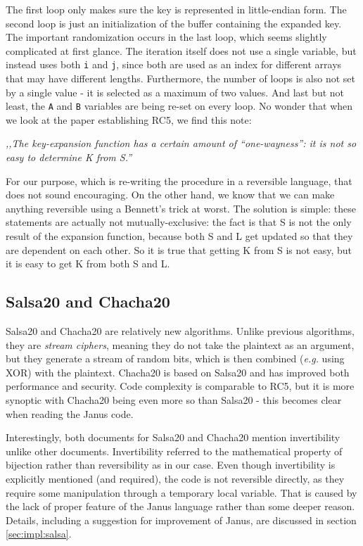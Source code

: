 \documentclass[a4paper,10pt,openright]{memoir}
\newcommand{\eg}{\emph{e.g.}\xspace}
\newcommand{\term}[1]{\textit{#1}}
\newcommand{\code}[1]{\texttt{#1}}
\begin{document}
The first loop only makes sure the key is represented in little-endian 
form. The second loop is just an initialization of the buffer 
containing the expanded key. The important randomization occurs in the 
last loop, which seems slightly complicated at first glance. The 
iteration itself does not use a single variable, but instead uses both 
\code{i} and \code{j}, since both are used as an index for different 
arrays that may have different lengths. Furthermore, the number of 
loops is also not set by a single value - it is selected as a maximum 
of two values. And last but not least, the \code{A} and \code{B} 
variables are being re-set on every loop. No wonder that when we look 
at the paper establishing RC5, we find this note: 

\textit{,,The key-expansion function has a certain amount of 
``one-wayness'': it is not so easy to determine K from S.''}

For our purpose, which is re-writing the procedure in a reversible 
language, that does not sound encouraging. On the other hand, we know that 
we can make anything reversible using a Bennett's trick at worst. The 
solution is simple: these statements are actually not 
mutually-exclusive: the fact is that S is not the only result of the 
expansion function, because both S and L get updated so that they are 
dependent on each other. So it is true that getting K from S is not 
easy, but it is easy to get K from both S and L.

\subsection{Salsa20 and Chacha20}

Salsa20 and Chacha20 are relatively new algorithms. Unlike previous 
algorithms, they are \term{stream ciphers}, meaning they do not take 
the plaintext as an argument, but they generate a stream of random 
bits, which is then combined (\eg using XOR) with the plaintext. 
Chacha20 is based on Salsa20 and has improved both performance and 
security. Code complexity is comparable to RC5, but it is more synoptic 
with Chacha20 being even more so than Salsa20 - this becomes clear when 
reading the Janus code.

Interestingly, both documents for Salsa20 and Chacha20 mention 
invertibility unlike other documents. Invertibility referred to the 
mathematical property of bijection rather than reversibility as in 
our case. Even though invertibility is explicitly mentioned (and 
required), the code is not reversible directly, as they require some 
manipulation through a temporary local variable. That is caused by the 
lack of proper feature of the Janus language rather than some deeper 
reason. Details, including a suggestion for improvement of Janus, are 
discussed in section \ref{sec:impl:salsa}.
\end{document}
